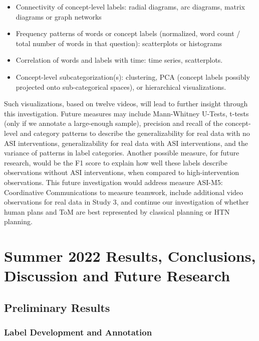 \begin{itemize}

    \item Connectivity of concept-level labels: radial diagrams, arc diagrams,
        matrix diagrams or graph networks

    \item Frequency patterns of words or concept labels (normalized, word count
        / total number of words in that question): scatterplots or histograms

    \item Correlation of words and labels with time: time series, scatterplots. 

    \item Concept-level subcategorization(s): clustering, PCA (concept labels
        possibly projected onto sub-categorical spaces), or hierarchical
        visualizations.

\end{itemize}


Such visualizations, based on twelve videos, will lead to further insight
through this investigation. Future measures may include Mann-Whitney U-Tests,
t-tests (only if we annotate a large-enough sample), precision and recall of
the concept-level and category patterns to describe the generalizability for
real data with no ASI interventions, generalizability for real data with ASI
interventions, and the variance of patterns in label categories. Another
possible measure, for future research, would be the F1 score to explain how
well these labels describe observations without ASI interventions, when
compared to high-intervention observations. This future investigation would
address measure ASI-M5: Coordinative Communications to
measure teamwork, include additional video observations for real data in Study
3, and continue our investigation of whether human plans and ToM are best
represented by classical planning or HTN planning.


\section{Summer 2022 Results, Conclusions, Discussion and Future Research}
\subsection{Preliminary Results}
\subsubsection{Label Development and Annotation}

